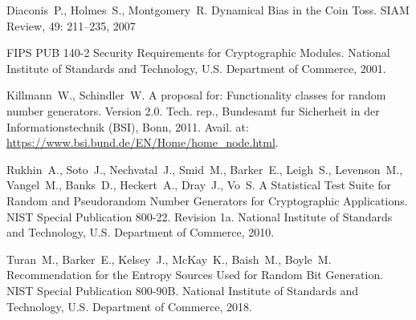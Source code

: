 \clearpage
\begin{thebibliography}{9}

Diaconis~P., Holmes~S., Montgomery~R. 
Dynamical Bias in the Coin Toss. 
SIAM Review, 49: 211--235, 2007

FIPS PUB 140-2 Security Requirements for Cryptographic Modules.
National Institute of Standards and Technology, U.S. Department of Commerce, 
2001.

Killmann~W., Schindler~W. 
A proposal for: Functionality classes for random number generators. Version 2.0. 
Tech. rep., Bundesamt fur Sicherheit in der Informationstechnik (BSI), Bonn, 2011.
Avail. at: \url{https://www.bsi.bund.de/EN/Home/home_node.html}.

Rukhin~A., Soto~J., Nechvatal~J., Smid~M., Barker~E., Leigh~S., 
Levenson~M., Vangel~M., Banks~D., Heckert~A., Dray~J., Vo~S.
A Statistical Test Suite for Random and Pseudorandom Number Generators for
Cryptographic Applications. NIST Special Publication 800-22. Revision 1a.
National Institute of Standards and Technology, U.S. Department of Commerce, 
2010.

Turan~M., Barker~E., Kelsey~J., McKay~K., Baish~M., Boyle~M.
Recommendation for the Entropy Sources Used for Random Bit Generation.
NIST Special Publication 800-90B.
National Institute of Standards and Technology, U.S. Department of Commerce, 
2018.
\end{thebibliography}
